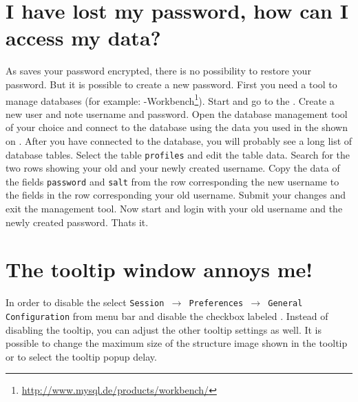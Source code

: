 \section{I have lost my password, how can I access my data?}
  As \sh saves your password encrypted, there is no possibility to restore your password.
  But it is possible to create a new password.
  First you need a tool to manage \mysql databases (for example: \mysql-Workbench\footnote{\url{http://www.mysql.de/products/workbench/}}).
  Start \sh and go to the . Create a new user and note username and password.
  Open the database management tool of your choice and connect to the database using the data you used in the  shown on .
  After you have connected to the database, you will probably see a long list of database tables.
  Select the table \texttt{profiles} and edit the table data.
  Search for the two rows showing your old and your newly created username.
  Copy the data of the fields \texttt{password} and \texttt{salt} from the row corresponding the new username to the fields in the row corresponding your old username.
  Submit your changes and exit the management tool.
  Now start \sh and login with your old username and the newly created password.
  Thats it.

\section{The tooltip window annoys me!}
  In order to disable the  select \texttt{Session $\rightarrow$ Preferences $\rightarrow$ General Configuration} from \shs menu bar
  and disable the checkbox labeled . Instead of disabling the tooltip, you can adjust the other tooltip settings as well.
  It is possible to change the maximum size of the structure image shown in the tooltip or to select the tooltip popup delay.